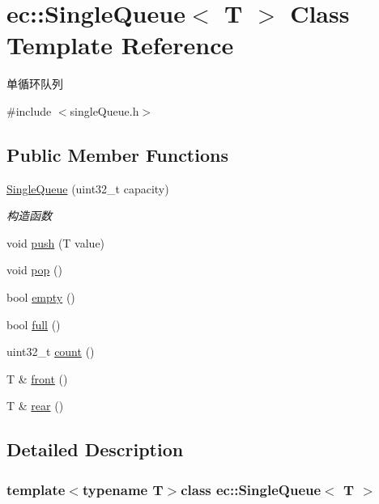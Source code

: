 \hypertarget{classec_1_1SingleQueue}{\section{ec\-:\-:Single\-Queue$<$ T $>$ Class Template Reference}
\label{classec_1_1SingleQueue}
}


单循环队列  




{\ttfamily \#include $<$single\-Queue.\-h$>$}

\subsection*{Public Member Functions}
\begin{DoxyCompactItemize}
\item 
\hyperlink{classec_1_1SingleQueue_a7b00a1ab2f2731190a7bddf3ea85e2c2}{Single\-Queue} (uint32\-\_\-t capacity)
\begin{DoxyCompactList}\small\item\em 构造函数 \end{DoxyCompactList}\item 
void \hyperlink{classec_1_1SingleQueue_ad3ff61a80782a76971cd688e00e7eae8}{push} (T value)
\item 
void \hyperlink{classec_1_1SingleQueue_a3e4efdff7d19761ad7b3c05321e02520}{pop} ()
\item 
bool \hyperlink{classec_1_1SingleQueue_a6380454a9d7588d715884e85e3be7312}{empty} ()
\item 
bool \hyperlink{classec_1_1SingleQueue_ae3a2bb25e2a83b3a09dcacac84de1fb1}{full} ()
\item 
uint32\-\_\-t \hyperlink{classec_1_1SingleQueue_a71623b32e70dd0e53f8413c7b43bf7ca}{count} ()
\item 
T \& \hyperlink{classec_1_1SingleQueue_ace5fffd93a3eaed17ce545b17925813f}{front} ()
\item 
T \& \hyperlink{classec_1_1SingleQueue_a55e2ac6df57ba91c264955685adb94a0}{rear} ()
\end{DoxyCompactItemize}


\subsection{Detailed Description}
\subsubsection*{template$<$typename T$>$class ec\-::\-Single\-Queue$<$ T $>$}

